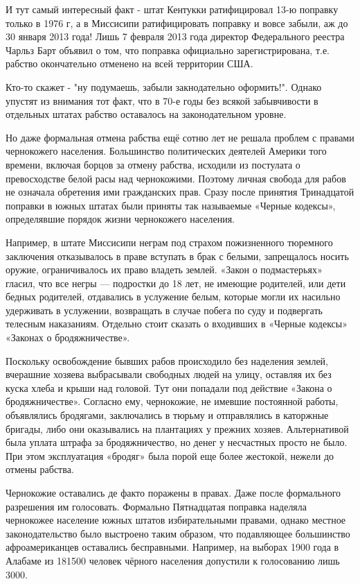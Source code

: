\documentclass[a4paper,11pt]{extreport}
\begin{document}
И тут самый интересный факт - штат Кентукки ратифицировал 13-ю поправку только
в 1976 г, а в Миссисипи ратифицировать поправку и вовсе забыли, аж до 30 января
2013 года! Лишь 7 февраля 2013 года директор Федерального реестра Чарльз Барт
объявил о том, что поправка официально зарегистрирована, т.е. рабство
окончательно отменено на всей территории США.

Кто-то скажет - "ну подумаешь, забыли закнодательно оформить!". Однако упустят
из внимания тот факт, что в 70-е годы без всякой забывчивости в отдельных
штатах рабство оставалось на законодательном уровне.


Но даже формальная отмена рабства ещё сотню лет не решала проблем с правами
чернокожего населения. Большинство политических деятелей Америки того времени,
включая борцов за отмену рабства, исходили из постулата о превосходстве белой
расы над чернокожими. Поэтому личная свобода для рабов не означала обретения
ими гражданских прав. Сразу после принятия Тринадцатой поправки в южных штатах
были приняты так называемые «Черные кодексы», определявшие порядок жизни
чернокожего населения.

Например, в штате Миссисипи неграм под страхом пожизненного тюремного
заключения отказывалось в праве вступать в брак с белыми, запрещалось носить
оружие, ограничивалось их право владеть землей. «Закон о подмастерьях» гласил,
что все негры --- подростки до 18 лет, не имеющие родителей, или дети бедных
родителей, отдавались в услужение белым, которые могли их насильно удерживать в
услужении, возвращать в случае побега по суду и подвергать телесным наказаниям.
Отдельно стоит сказать о входивших в «Черные кодексы» «Законах о
бродяжничестве».

Поскольку освобождение бывших рабов происходило без наделения землей, вчерашние
хозяева выбрасывали свободных людей на улицу, оставляя их без куска хлеба и
крыши над головой. Тут они попадали под действие «Закона о бродяжничестве».
Согласно ему, чернокожие, не имевшие постоянной работы, объявлялись бродягами,
заключались в тюрьму и отправлялись в каторжные бригады, либо они оказывались
на плантациях у прежних хозяев. Альтернативой была уплата штрафа за
бродяжничество, но денег у несчастных просто не было. При этом эксплуатация
«бродяг» была порой еще более жестокой, нежели до отмены рабства.

Чернокожие оставались де факто поражены в правах. Даже после формального
разрешения им голосовать. Формально Пятнадцатая поправка наделяла чернокожее
население южных штатов избирательными правами, однако местное законодательство
было выстроено таким образом, что подавляющее большинство афроамериканцев
оставались бесправными. Например, на выборах 1900 года в Алабаме из 181500
человек чёрного населения допустили к голосованию лишь 3000.
\end{document}
